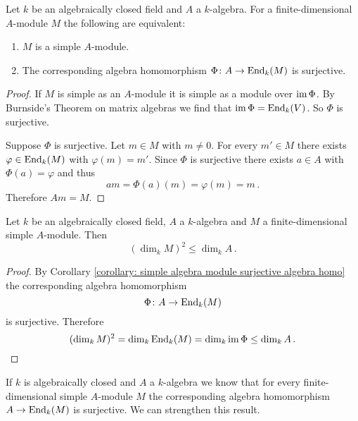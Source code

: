 \begin{corollary}\label{corollary: simple algebra module surjective algebra homo}
  Let $k$ be an algebraically closed field and $A$ a  $k$-algebra.
  For a finite-dimensional $A$-module $M$ the following are equivalent:
  \begin{enumerate}[label=\emph{\alph*)},leftmargin=*]
    \item
      $M$ is a simple $A$-module.
    \item
      The corresponding algebra homomorphism $\Phi \colon A \to \operatorname{End}_k(M)$ is surjective.
  \end{enumerate}
\end{corollary}
\begin{proof}
  If $M$ is simple as an $A$-module it is simple as a module over $\operatorname{im} \Phi$.
  By Burnside’s Theorem on matrix algebras we find that $\operatorname{im} \Phi = \operatorname{End}_k(V)$.
  So $\Phi$ is surjective.
  
  Suppose $\Phi$ is surjective.
  Let $m \in M$ with $m \neq 0$.
  For every $m' \in M$ there exists $\varphi \in \operatorname{End}_k(M)$ with $\varphi(m) = m'$.
  Since $\Phi$ is surjective there exists $a \in A$ with $\Phi(a) = \varphi$ and thus
  \[
      am
    = \Phi(a)(m)
    = \varphi(m)
    = m \,.
  \]
  Therefore $Am = M$.
\end{proof}


\begin{corollary}\label{corollary: dimension simple algebra modules}
  Let $k$ be an algebraically closed field, $A$ a $k$-algebra and $M$ a finite-dimensional simple $A$-module.
  Then
  \[
          (\dim_k M)^2
    \leq  \dim_k A \,.
  \]
\end{corollary}
\begin{proof}
  By Corollary \ref{corollary: simple algebra module surjective algebra homo} the corresponding algebra homomorphism
  \[
            \Phi
    \colon  A
    \to     \operatorname{End}_k(M)
  \]
  is surjective. Therefore
  \[
          (\dim_k M)^2
    =     \dim_k \operatorname{End}_k(M)
    =     \dim_k \operatorname{im} \Phi
    \leq  \dim_k A \,.
    \qedhere
  \]
\end{proof}


If $k$ is algebraically closed and $A$ a $k$-algebra we know that for every finite-dimensional simple $A$-module $M$ the corresponding algebra homomorphism $A \to \operatorname{End}_k(M)$ is surjective.
We can strengthen this result.


